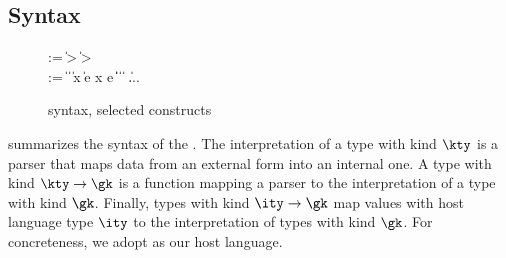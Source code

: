 \subsection{\ddc{} Syntax}
\begin{figure}
{\small
\begin{bnf}
   \meta{\gk} \::= \kty \| \kty \-> \gk
                               \| \ity \-> \gk  \\
   \meta{\ty} \::= 
     \| 
    \plam{\var}{\ity}{\ty} \|  \| 
    \psig x \ty \ty \| \psum \ty e \ty \nlalt
    \pset x \ty e \|
    \ptyvar \| \pmu{\ptyvar}{\gk}{\ty} \| 
    \ptylam{\ptyvar}{\kty}{\ty} \| \ptyapp{\ty}{\ty} \| ...
\end{bnf}
}
\caption{\ddc{} syntax, selected constructs}
\label{fig:ddc-syntax}
\end{figure}

 summarizes the syntax of the \ddc.
The interpretation of a type with kind $\kty$ is a parser that maps
data from an external form into an internal one.  
A type with kind $\kty \rightarrow \gk$ is a function mapping 
a parser to the interpretation of a type with kind $\gk$.
Finally, types with kind $\ity \rightarrow \gk$  map values
with host language type $\ity$ to the interpretation of
types with kind $\gk$.  For concreteness, we adopt \fomega{} as our
host language.


